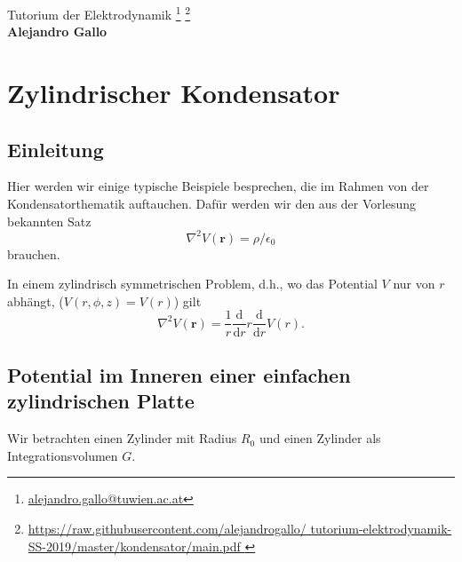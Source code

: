 \documentclass[A4paper, 12pt]{amsart}
\title{\thetitle}
\author{\me}
\date{\today}
\makeatletter
\newcommand\thetitle{Tutorium der Elektrodynamik}
\newcommand\me{Alejandro Gallo}
\newcommand\sourcefootnotes{
\footnote{\tiny \url{alejandro.gallo@tuwien.ac.at} }
\footnote{\tiny
  \url{
    https://raw.githubusercontent.com/alejandrogallo/
    tutorium-elektrodynamik-SS-2019/master/kondensator/main.pdf
  }
}
}
\makeatother
\begin{document}
\begin{center}
  {\Large\sc \thetitle} \sourcefootnotes\\
  {\large\bf \me}
\end{center}
\vspace{3cm}
\tableofcontents

\newpage
\section{Zylindrischer Kondensator}

\subsection{Einleitung}
Hier werden wir einige typische Beispiele
besprechen, die im Rahmen von der Kondensatorthematik
auftauchen.
Dafür werden wir den aus der Vorlesung bekannten Satz
%
\begin{equation}
  \label{eq:gauss_theorem}
  \nabla ^{2} V(\mathbf{r}) = \rho / \epsilon_{0}
\end{equation}
%
brauchen.

In einem zylindrisch symmetrischen Problem, d.h., wo das Potential
$ V $ nur von $ r $ abhängt, ($ V(r, \phi, z) = V(r) $) gilt
%
\begin{equation}
  \label{eq:laplacian_in_cylindrical_coordinates}
  \nabla ^{2} V(\mathbf{r}) =
  \frac{1}{r}
  \frac{\mathrm{d}}{\mathrm{d}r}
  r
  \frac{\mathrm{d}}{\mathrm{d}r}
  V(r)
  .
\end{equation}
%

\subsection{Potential im Inneren einer einfachen zylindrischen Platte}

Wir betrachten einen Zylinder mit Radius $ R_{0} $ und einen
Zylinder als Integrationsvolumen $ G $.

\begin{center}
  
\end{center}
\end{document}

